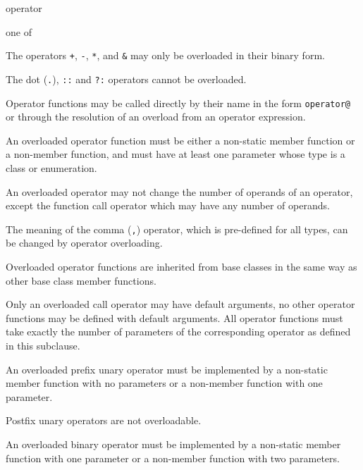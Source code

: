 
\begin{grammar}
\br
   operator

 \textnormal{one of}\br
  \terminal{+ - * / \% \^\/ \& | ~ ! < > << >> <= >= \&\& || , \(\) \[\]}
\end{grammar}

\p The operators \texttt{+}, \texttt{-}, \texttt{*}, and \texttt{\&} may only be
overloaded in their binary form.

\p The dot (\texttt{.}), \texttt{::} and \texttt{?:} operators cannot be
overloaded.

\p Operator functions may be called directly by their name in the form
\texttt{operator@} or through the resolution of an overload from an operator
expression.

\p An overloaded operator function must be either a non-static member function
or a non-member function, and must have at least one parameter whose type is a
class or enumeration.

\p An overloaded operator may not change the number of operands of an operator,
except the function call operator which may have any number of operands.

\p The meaning of the comma (\texttt{,}) operator, which is pre-defined for all
types, can be changed by operator overloading.

\p Overloaded operator functions are inherited from base classes in the same way
as other base class member functions.

\p Only an overloaded call operator may have default arguments, no other
operator functions may be defined with default arguments. All operator functions
must take exactly the number of parameters of the corresponding operator as
defined in this subclause.


\p An overloaded prefix unary operator must be implemented by a non-static member
function with no parameters or a non-member function with one parameter.

\p Postfix unary operators are not overloadable.


\p An overloaded binary operator must be implemented by a non-static member
function with one parameter or a non-member function with two parameters.

